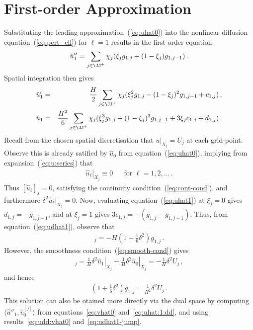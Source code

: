 \documentclass[12pt,a5paper]{article}
\begin{document}
\section{First-order Approximation}\label{sec:first-order}
Substituting the leading approximation~(\ref{eq:uhat0}) into the
nonlinear diffusion equation~(\ref{eq:pert_ell}) for $\ell=1$ results in
the first-order equation
\begin{eqnarray}
\hat{u}''_1 = \sum_{j\in\JJ^+}\chi_j(\xi_j g_{1,j}+(1-\xi_j)g_{1,j-1})\,.
\label{eq:uhat:1:dd}
\end{eqnarray}
Spatial integration then gives
\begin{eqnarray}
\hat{u}'_1 & = & \frac{H}{2}\sum_{j\in\JJ^+}\chi_j(\xi^2_j g_{1,j}
-(1-\xi_j)^2g_{1,j-1}+c_{1,j})\,,
\label{eq:udhat1}
\\
\hat{u}_1 & = & \frac{H^2}{6}\sum_{j\in\JJ^+}\chi_j(\xi^3_j g_{1,j}
+(1-\xi_j)^3g_{1,j-1}+3\xi_{j}c_{1,j}+d_{1,j})\,.
\label{eq:uhat1}
\end{eqnarray}
Recall from the chosen  spatial discretisation that $u|_{X_j}=U_{j}$ at each grid-point.
Observe this is already satified by $\hat{u}_0$ from equation~(\ref{eq:uhat0}), implying
from expansion~(\ref{eq:u:series}) that
\begin{eqnarray}
\left.\hat{u}_\ell\right|_{X_j}\equiv 0 && \mbox{for }\ell=1,2,\ldots\,.
\label{eq:u_ell_fixed}
\end{eqnarray}
Thus $[\hat{u}_\ell]_j=0$, satisfying the continuity 
condition~(\ref{eq:cont-cond}), and furthermore $\delta^2\hat{u}_\ell|_{X_j}=0$.
Now, evaluating equation~(\ref{eq:uhat1}) at $\xi_j=0$ gives $d_{1,j}=-g_{1,j-1}$,
and at $\xi_j=1$ gives $3c_{1,j}=-(g_{1,j}-g_{1,j-1})$.
Thus,  from equation~(\ref{eq:udhat1}), observe that
\begin{eqnarray}
[\hat{u}'_1]_j = -H\left(1+\frac{1}{6}\delta^2\right)g_{1,j}\,.
\end{eqnarray}
However, the smoothness condition~(\ref{eq:smooth-cond}) gives
\begin{eqnarray}
   [\hat{u}'_1]_j = 
\frac{1}{H}\left.\delta^{2}\hat{u}_1\right|_{X_j}
-\frac{1}{H}\left.\delta^{2}\hat{u}_0\right|_{X_j}
= -\frac{1}{H}\delta^{2}U_j\,,
\label{eq:udhat1-jump}
\end{eqnarray}
and hence
\begin{eqnarray}
\left(1+\frac{1}{6}\delta^2\right)g_{1,j} = \frac{1}{H^2}\delta^2U_j\,.
\label{eq:g1}
\end{eqnarray}
This solution can also be otained more directly via the dual space by computing $\langle\hat{u}''_1,\hat{v}_0^{[j]}\rangle$ from
equations~\eqref{eq:vhat0} and~\eqref{eq:uhat:1:dd}, and using results~\eqref{eq:udd:vhat0} and~\eqref{eq:udhat1-jump}.
\end{document}
